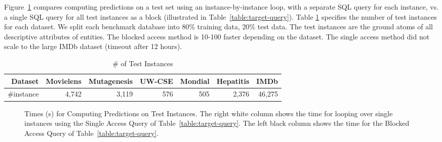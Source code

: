 Figure~\ref{fig:test-timing} compares computing predictions on a test set using an instance-by-instance loop, with a separate SQL query for each instance, vs. a single SQL query for all test instances as a block (illustrated in Table~\ref{table:target-query}). Table \ref{tab:test-instance} specifies the number of  test instances for each dataset. We split each benchmark database into  80\% training data, 20\% test data. The test instances are the ground atoms of all descriptive attributes of entities.  The blocked access method is 10-100 faster depending on the dataset. The single access method did not scale to the large IMDb dataset (timeout after 12 hours).

\begin{table}[htbp]
\caption{\# of Test Instances }
  \centering
  \begin{tabular}{|r|r|r|r|r|r|r|} \hline
\textbf{Dataset}&Movielens&	Mutagenesis	& 	UW-CSE	&	Mondial&	Hepatitis&	 	IMDb \\ \hline
{\#instance}	&4,742	 	&	3,119		&576	&		505&2,376	 	&46,275 \\ \hline
    
\end{tabular}%
  \label{tab:test-instance}%
\end{table}%

\begin{figure}[htbp] %
 \centering
{} 
\caption{Times (s) for Computing Predictions on Test Instances. The right white column shows the time for looping over single instances using the Single Access Query of Table~\ref{table:target-query}. The left black column shows the time for the Blocked Access Query of Table~\ref{table:target-query}.
}
 \label{fig:test-timing}
\end{figure}

